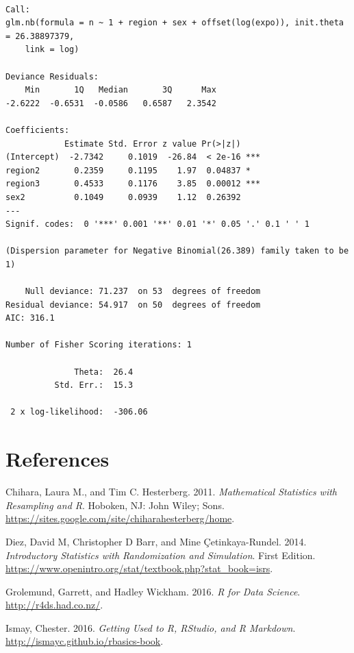 \documentclass[
]{book}
\begin{document}
\begin{verbatim}

Call:
glm.nb(formula = n ~ 1 + region + sex + offset(log(expo)), init.theta = 26.38897379, 
    link = log)

Deviance Residuals: 
    Min       1Q   Median       3Q      Max  
-2.6222  -0.6531  -0.0586   0.6587   2.3542  

Coefficients:
            Estimate Std. Error z value Pr(>|z|)    
(Intercept)  -2.7342     0.1019  -26.84  < 2e-16 ***
region2       0.2359     0.1195    1.97  0.04837 *  
region3       0.4533     0.1176    3.85  0.00012 ***
sex2          0.1049     0.0939    1.12  0.26392    
---
Signif. codes:  0 '***' 0.001 '**' 0.01 '*' 0.05 '.' 0.1 ' ' 1

(Dispersion parameter for Negative Binomial(26.389) family taken to be 1)

    Null deviance: 71.237  on 53  degrees of freedom
Residual deviance: 54.917  on 50  degrees of freedom
AIC: 316.1

Number of Fisher Scoring iterations: 1

              Theta:  26.4 
          Std. Err.:  15.3 

 2 x log-likelihood:  -306.06 
\end{verbatim}

\hypertarget{biblio}{%
\chapter{References}\label{biblio}}

\hypertarget{refs}{}
\leavevmode\hypertarget{ref-hester2011}{}%
Chihara, Laura M., and Tim C. Hesterberg. 2011. \emph{Mathematical Statistics with Resampling and R}. Hoboken, NJ: John Wiley; Sons. \url{https://sites.google.com/site/chiharahesterberg/home}.

\leavevmode\hypertarget{ref-isrs2014}{}%
Diez, David M, Christopher D Barr, and Mine Çetinkaya-Rundel. 2014. \emph{Introductory Statistics with Randomization and Simulation}. First Edition. \url{https://www.openintro.org/stat/textbook.php?stat_book=isrs}.

\leavevmode\hypertarget{ref-rds2016}{}%
Grolemund, Garrett, and Hadley Wickham. 2016. \emph{R for Data Science}. \url{http://r4ds.had.co.nz/}.

\leavevmode\hypertarget{ref-usedtor2016}{}%
Ismay, Chester. 2016. \emph{Getting Used to R, RStudio, and R Markdown}. \url{http://ismayc.github.io/rbasics-book}.
\end{document}
